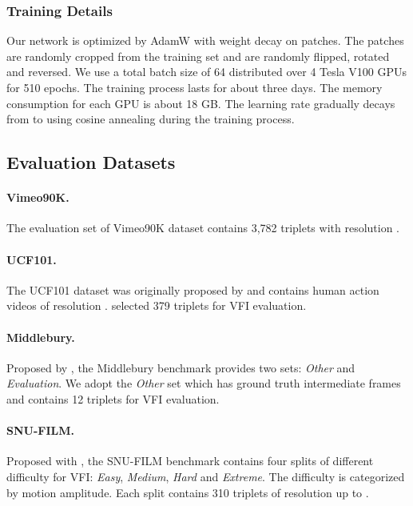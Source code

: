\documentclass{article}
\begin{document}
\subsubsection{Training Details}

Our network is optimized by AdamW \cite{adamw} with weight decay  on  patches. The patches are randomly cropped from the training set and are randomly flipped, rotated and reversed. We use a total batch size of 64 distributed over 4 Tesla V100 GPUs for 510 epochs. The training process lasts for about three days. The memory consumption for each GPU is about 18 GB. The learning rate gradually decays from  to  using cosine annealing during the training process.

\subsection{Evaluation Datasets}

\paragraph{Vimeo90K.} The evaluation set of Vimeo90K dataset \cite{toflow} contains 3,782 triplets with resolution .

\paragraph{UCF101.} The UCF101 dataset was originally proposed by \cite{ucf101} and contains human action videos of resolution . \cite{deepvoxelflow} selected 379 triplets for VFI evaluation.

\paragraph{Middlebury.} Proposed by \cite{middlebury}, the Middlebury benchmark provides two sets: \textit{Other} and \textit{Evaluation}. We adopt the \textit{Other} set which has ground truth intermediate frames and contains 12 triplets for VFI evaluation.

\paragraph{SNU-FILM.} Proposed with \cite{cain}, the SNU-FILM benchmark contains four splits of different difficulty for VFI: \textit{Easy}, \textit{Medium}, \textit{Hard} and \textit{Extreme}. The difficulty is categorized by motion amplitude. Each split contains 310 triplets of resolution up to .
\end{document}
